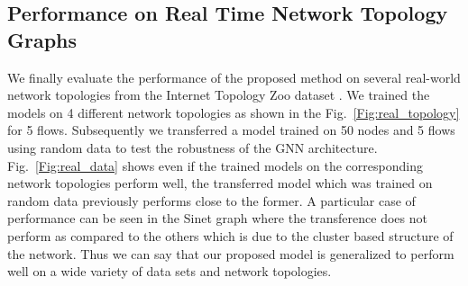 \documentclass[lettersize,journal]{IEEEtran}
\begin{document}
\subsection{Performance on Real Time Network Topology Graphs}
We finally evaluate the performance of the proposed method%
on several real-world network topologies from the Internet Topology Zoo dataset \cite{knight2011internet}. We trained the models on 4 different network topologies as shown in the Fig.~\ref{Fig:real_topology} for 5 flows. Subsequently we transferred a model trained on 50 nodes and 5 flows using random data to test the robustness of the GNN architecture. Fig.~\ref{Fig:real_data} shows even if the trained models on the corresponding network topologies perform well, the transferred model which was trained on random data previously performs close to the former. A particular case of performance can be seen in the Sinet graph where the transference does not perform as compared to the others which is due to the cluster based structure of the network. Thus we can say that our proposed model is generalized to perform well on a wide variety of data sets and network topologies.

\begin{figure*}%
    \centering   
    \hfill
    \caption{Performance of State-Augmentation based routing policy on real world network topology}
    \label{Fig:real_data}
\end{figure*}

\end{document}
